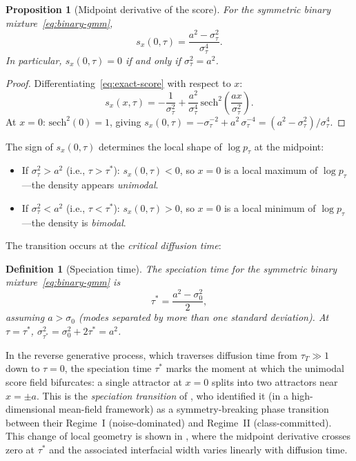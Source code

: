 \documentclass[11pt]{article}
\newtheorem{proposition}[theorem]{Proposition}
\newtheorem{definition}[theorem]{Definition}
\newcommand{\sech}{\mathrm{sech}}
\begin{document}
\begin{proposition}[Midpoint derivative of the score]\label{prop:sx-origin}
For the symmetric binary mixture~\eqref{eq:binary-gmm},
\begin{equation}\label{eq:sx-origin}
  s_x(0,\tau)
  = \frac{a^2 - \sigma_\tau^2}{\sigma_\tau^4}.
\end{equation}
In particular, $s_x(0,\tau) = 0$ if and only if $\sigma_\tau^2 = a^2$.
\end{proposition}

\begin{proof}
Differentiating~\eqref{eq:exact-score} with respect to $x$:
\[
  s_x(x,\tau)
  = -\frac{1}{\sigma_\tau^2}
    + \frac{a^2}{\sigma_\tau^4}\,\sech^2\!\left(\frac{ax}{\sigma_\tau^2}\right).
\]
At $x = 0$: $\sech^2(0) = 1$, giving $s_x(0,\tau) = -\sigma_\tau^{-2} + a^2\,\sigma_\tau^{-4} = (a^2 - \sigma_\tau^2)/\sigma_\tau^4$.
\end{proof}

The sign of $s_x(0,\tau)$ determines the local shape of $\log p_\tau$ at the midpoint:
\begin{itemize}[nosep]
\item If $\sigma_\tau^2 > a^2$ (i.e., $\tau > \tau^\ast$): $s_x(0,\tau) < 0$, so $x = 0$ is a local maximum of $\log p_\tau$---the density appears \emph{unimodal}.
\item If $\sigma_\tau^2 < a^2$ (i.e., $\tau < \tau^\ast$): $s_x(0,\tau) > 0$, so $x = 0$ is a local minimum of $\log p_\tau$---the density is \emph{bimodal}.
\end{itemize}
The transition occurs at the \emph{critical diffusion time}:
\begin{definition}[Speciation time]\label{def:tau-star}
The speciation time for the symmetric binary mixture~\eqref{eq:binary-gmm} is
\begin{equation}\label{eq:tau-star}
  \tau^\ast = \frac{a^2 - \sigma_0^2}{2},
\end{equation}
assuming $a > \sigma_0$ (modes separated by more than one standard deviation).
At $\tau = \tau^\ast$, $\sigma_{\tau^\ast}^2 = \sigma_0^2 + 2\tau^\ast = a^2$.
\end{definition}

In the reverse generative process, which traverses diffusion time from $\tau_T \gg 1$ down to $\tau = 0$, the speciation time $\tau^\ast$ marks the moment at which the unimodal score field bifurcates: a single attractor at $x = 0$ splits into two attractors near $x = \pm a$.
This is the \emph{speciation transition} of \citet{biroli2024dynamical}, who identified it (in a high-dimensional mean-field framework) as a symmetry-breaking phase transition between their Regime~I (noise-dominated) and Regime~II (class-committed).
This change of local geometry is shown in , where the midpoint derivative crosses zero at $\tau^\ast$ and the associated interfacial width varies linearly with diffusion time.
\end{document}
